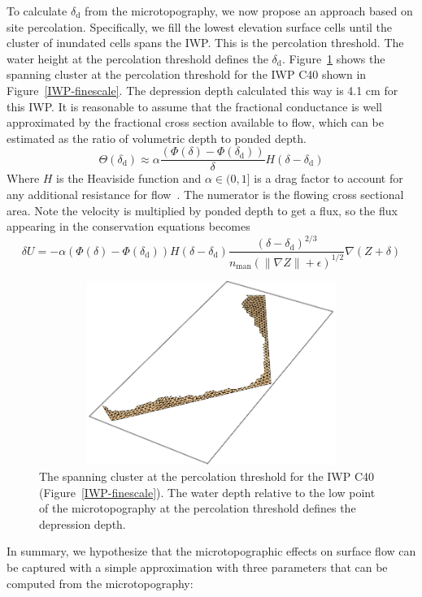 \documentclass[review,11pt]{elsarticle}
\begin{document}
To calculate $\delta_\text{d}$ from the microtopography, we now propose an approach based on site percolation. Specifically, we fill the lowest elevation surface cells until the cluster of inundated cells spans the IWP. This is the percolation threshold. The water height at the percolation threshold defines the $\delta_\text{d}$. Figure~\ref{perc-cluster-poly40} shows the spanning cluster at the percolation threshold for the IWP C40 shown in Figure~\ref{IWP-finescale}. The depression depth calculated this way is 4.1 cm for this IWP.
It is reasonable to assume that the fractional conductance is well approximated by the fractional cross section available to flow, which can be estimated as the ratio of volumetric depth to ponded depth.
\begin{equation}
\Theta {(\delta_\text{d})} \approx \alpha \frac{( \Phi (\delta) - \Phi (\delta_\text{d}))} {\delta} H \left( \delta - \delta_\text{d}\right )
\end{equation}
Where $H$ is the Heaviside function and $\alpha \in (0,1]$ is a drag factor to account for any additional resistance for flow~\cite{panday2004fully}. The numerator is the flowing cross sectional area. Note the velocity is multiplied by ponded depth to get a flux, so the flux appearing in the conservation equations becomes
\begin{equation}
 \delta U = - \alpha ( \Phi (\delta) - \Phi (\delta_\text{d})) H \left( \delta - \delta_\text{d}\right ) \frac{(\delta - \delta_\text{d})^{2/3}}{n_\text{man} (\| \nabla Z \| +\epsilon)^{1/2}} \nabla(Z + \delta)
\end{equation}
\begin{figure}
\centering
\includegraphics[width=12cm, height=6cm]{./figures/polygons-finescale/percolation-cluster-poly40.png}
\caption{The spanning cluster at the percolation threshold for the IWP C40 (Figure~\ref{IWP-finescale}). The water depth relative to the low point of the microtopography at the percolation threshold defines the depression depth.}
\label{perc-cluster-poly40}
\end{figure}
In summary, we hypothesize that the microtopographic effects on surface flow can be captured with a simple approximation with three parameters that can be computed from the microtopography:
\end{document}
